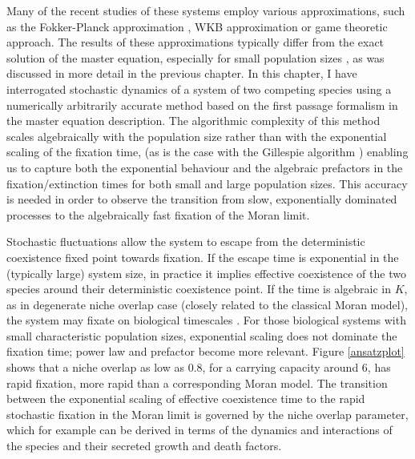 Many of the recent studies of these systems employ various approximations, such as the Fokker-Planck approximation \cite{Chotibut2015,Dobrinevski2012,Fisher2014,Constable2015,Lin2012}, WKB approximation \cite{Kessler2007,Gabel2013} or game theoretic \cite{Antal2006} approach. 
The results of these approximations typically differ from the exact solution of the master equation, especially for small population sizes \cite{Doering2005,Kessler2007,Ovaskainen2010,Assaf2016,Badali2019b}, as was discussed in more detail in the previous chapter. 
In this chapter, I have interrogated stochastic dynamics of a system of two competing species using a numerically arbitrarily accurate method based on the first passage formalism in the master equation description. 
The algorithmic complexity of this method scales algebraically with the population size rather than with the exponential scaling of the fixation time, (as is the case with the Gillespie algorithm \cite{Gillespie1977}) enabling us to capture both the exponential behaviour and the algebraic prefactors in the fixation/extinction times for both small and large population sizes. %
This accuracy is needed in order to observe the transition from slow, exponentially dominated processes to the algebraically fast fixation of the Moran limit. 

Stochastic fluctuations allow the system to escape from the deterministic coexistence fixed point towards fixation. 
If the escape time is exponential in the (typically large) system size, in practice it implies effective coexistence of the two species around their deterministic coexistence point. 
If the time is algebraic in $K$, as in degenerate niche overlap case (closely related to the classical Moran model), the system may fixate on biological timescales \cite{Kimura1964,Moran1962}. 
For those biological systems with small characteristic population sizes, exponential scaling does not dominate the fixation time; power law and prefactor become more relevant. 
Figure \ref{ansatzplot} shows that a niche overlap as low as $0.8$, for a carrying capacity around $6$, has rapid fixation, more rapid than a corresponding Moran model. %
The transition between the exponential scaling of effective coexistence time to the rapid stochastic fixation in the Moran limit is governed by the niche overlap parameter, which for example can be derived in terms of the dynamics and interactions of the species and their secreted growth and death factors. %

